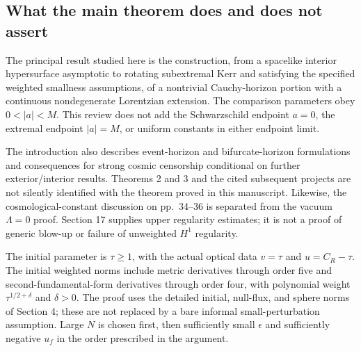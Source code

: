 \documentclass[10pt]{article}
\begin{document}
\subsection*{What the main theorem does and does not assert}
The principal result studied here is the construction, from a spacelike interior hypersurface asymptotic to rotating subextremal Kerr and satisfying the specified weighted smallness assumptions, of a nontrivial Cauchy-horizon portion with a continuous nondegenerate Lorentzian extension. The comparison parameters obey \(0<|a|<M\). This review does not add the Schwarzschild endpoint \(a=0\), the extremal endpoint \(|a|=M\), or uniform constants in either endpoint limit.\par
The introduction also describes event-horizon and bifurcate-horizon formulations and consequences for strong cosmic censorship conditional on further exterior/interior results. Theorems 2 and 3 and the cited subsequent projects are not silently identified with the theorem proved in this manuscript. Likewise, the cosmological-constant discussion on pp. 34–36 is separated from the vacuum \(\Lambda=0\) proof. Section 17 supplies upper regularity estimates; it is not a proof of generic blow-up or failure of unweighted \(H^1\) regularity.\par
The initial parameter is \(\tau\geq1\), with the actual optical data \(v=\tau\) and \(u=C_R-\tau\). The initial weighted norms include metric derivatives through order five and second-fundamental-form derivatives through order four, with polynomial weight \(\tau^{1/2+\delta}\) and \(\delta>0\). The proof uses the detailed initial, null-flux, and sphere norms of Section 4; these are not replaced by a bare informal small-perturbation assumption. Large \(N\) is chosen first, then sufficiently small \(\epsilon\) and sufficiently negative \(u_f\) in the order prescribed in the argument.\par
\end{document}
